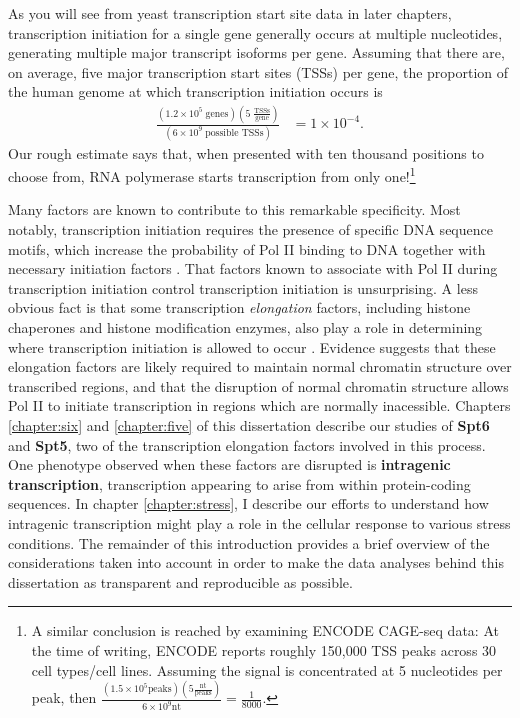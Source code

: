 As you will see from yeast transcription start site data in later chapters, transcription initiation for a single gene generally occurs at multiple nucleotides, generating multiple major transcript isoforms per gene.
Assuming that there are, on average, five major transcription start sites (TSSs) per gene, the proportion of the human genome at which transcription initiation occurs is
\begin{align*}
    \frac{\left(1.2 \times 10^5 \; \text{genes}\right) \left(5 \; \frac{\text{TSSs}}{\text{gene}} \right)}
         {\left(6 \times 10^9 \; \text{possible TSSs} \right)}
    &= 1 \times 10^{-4}.
\end{align*}
Our rough estimate says that, when presented with ten thousand positions to choose from, RNA polymerase starts transcription from only one!\footnote{A similar conclusion is reached by examining ENCODE CAGE-seq data: At the time of writing, ENCODE reports roughly 150,000 TSS peaks across 30 cell types/cell lines. Assuming the signal is concentrated at 5 nucleotides per peak, then $\frac{\left(1.5 \times 10^5 \text{peaks} \right) \left(5 \frac{\text{nt}}{\text{peaks}} \right)}{6 \times 10^9 \text{nt}} = \frac{1}{8000}$.}

Many factors are known to contribute to this remarkable specificity.
Most notably, transcription initiation requires the presence of specific DNA sequence motifs, which increase the probability of Pol II binding to DNA together with necessary initiation factors \citep{haberle2018}.
That factors known to associate with Pol II during transcription initiation control transcription initiation is unsurprising.
A less obvious fact is that some transcription \textit{elongation} factors, including histone chaperones and histone modification enzymes, also play a role in determining where transcription initiation is allowed to occur \citep{kaplan2003, cheung2008, hennig2013}.
Evidence suggests that these elongation factors are likely required to maintain normal chromatin structure over transcribed regions, and that the disruption of normal chromatin structure allows Pol II to initiate transcription in regions which are normally inacessible.
Chapters \ref{chapter:six} and \ref{chapter:five} of this dissertation describe our studies of \textbf{Spt6} and \textbf{Spt5}, two of the transcription elongation factors involved in this process.
One phenotype observed when these factors are disrupted is \textbf{intragenic transcription}, transcription appearing to arise from within protein-coding sequences.
In chapter \ref{chapter:stress}, I describe our efforts to understand how intragenic transcription might play a role in the cellular response to various stress conditions.
The remainder of this introduction provides a brief overview of the considerations taken into account in order to make the data analyses behind this dissertation as transparent and reproducible as possible.


